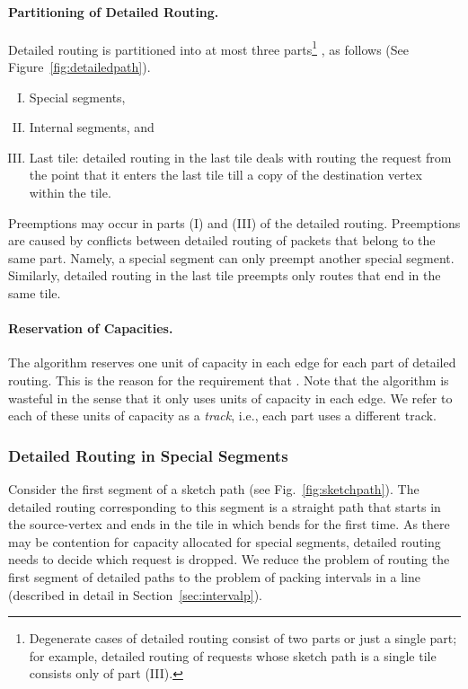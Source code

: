 \documentclass[11pt]{article}
\newenvironment{proof sketch}[1]{\noindent {\emph{Proof sketch of #1:}}}{\hfill \qed}
\begin{document}
\paragraph{Partitioning of Detailed Routing.}
Detailed routing is partitioned into at most three parts\footnote{Degenerate cases of detailed routing consist of two parts or just a single part; for example, detailed routing of requests whose sketch path is a single tile consists only of part (III).
}
, as follows (See Figure~\ref{fig:detailedpath}).
\begin{enumerate}[(I)]
\item Special segments,
\item Internal segments, and
\item Last tile: detailed routing in the last tile deals with routing the request from the point that it enters the last tile till a copy of the  destination vertex within the tile.
\end{enumerate}
Preemptions may occur in parts (I) and (III) of the detailed routing. Preemptions are caused by conflicts between detailed routing of packets that belong to the same part. Namely, a special segment can only preempt another special segment. Similarly, detailed routing in the last tile preempts only routes that end in the same tile.


\paragraph{Reservation of Capacities.}
The algorithm reserves one unit of capacity in each edge  for each part of detailed routing. This is the reason for the requirement that .
Note that the algorithm is wasteful in the sense that it only uses  units of capacity in each edge.
We refer to each of these  units of capacity as a \emph{track}, i.e., each part uses a different track.

\begin{comment}
  \bigskip
  \noindent
  We now elaborate on the detailed routing of every part, i.e.,
  special segments, internal segments and the last tile. We also
  elaborate on the transition between parts.
\end{comment}

\subsubsection{Detailed Routing in Special Segments}\label{sec:first detailed}
Consider the first segment of a sketch path  (see
Fig.~\ref{fig:sketchpath}).  The detailed routing corresponding to this segment is a
straight path that starts in the source-vertex  and ends in the tile in
which  bends for the first time. As there may be contention for capacity
allocated for special segments, detailed routing needs to decide which request is
dropped. We reduce the problem of routing the first segment of detailed paths to the
problem of packing intervals in a line (described in detail in
Section~\ref{sec:intervalp}).
\end{document}
